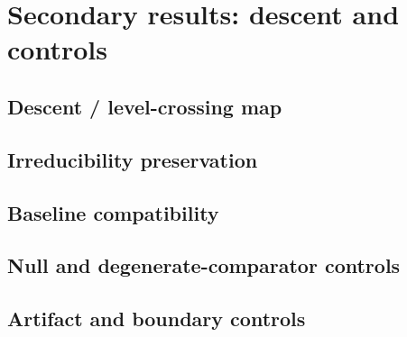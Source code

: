 \section{Secondary results: descent and controls}\label{sec:secondary-results}


\subsection{Descent / level-crossing map}\label{subsec:descent-map}


\subsection{Irreducibility preservation}\label{subsec:irreducibility-preservation}


\subsection{Baseline compatibility}\label{subsec:baseline-compatibility}


\subsection{Null and degenerate-comparator controls}\label{subsec:control-panel-null}


\subsection{Artifact and boundary controls}\label{subsec:control-panel-artifact-boundary}


